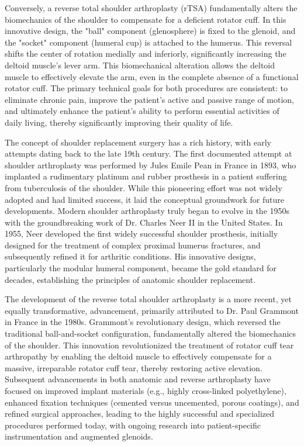 Conversely, a reverse total shoulder arthroplasty (rTSA) fundamentally alters the biomechanics of the shoulder to compensate for a deficient rotator cuff. In this innovative design, the "ball" component (glenosphere) is fixed to the glenoid, and the "socket" component (humeral cup) is attached to the humerus. This reversal shifts the center of rotation medially and inferiorly, significantly increasing the deltoid muscle's lever arm. This biomechanical alteration allows the deltoid muscle to effectively elevate the arm, even in the complete absence of a functional rotator cuff. The primary technical goals for both procedures are consistent: to eliminate chronic pain, improve the patient's active and passive range of motion, and ultimately enhance the patient's ability to perform essential activities of daily living, thereby significantly improving their quality of life.

The concept of shoulder replacement surgery has a rich history, with early attempts dating back to the late 19th century. The first documented attempt at shoulder arthroplasty was performed by Jules Emile Pean in France in 1893, who implanted a rudimentary platinum and rubber prosthesis in a patient suffering from tuberculosis of the shoulder. While this pioneering effort was not widely adopted and had limited success, it laid the conceptual groundwork for future developments. Modern shoulder arthroplasty truly began to evolve in the 1950s with the groundbreaking work of Dr. Charles Neer II in the United States. In 1955, Neer developed the first widely successful shoulder prosthesis, initially designed for the treatment of complex proximal humerus fractures, and subsequently refined it for arthritic conditions. His innovative designs, particularly the modular humeral component, became the gold standard for decades, establishing the principles of anatomic shoulder replacement.

The development of the reverse total shoulder arthroplasty is a more recent, yet equally transformative, advancement, primarily attributed to Dr. Paul Grammont in France in the 1980s. Grammont's revolutionary design, which reversed the traditional ball-and-socket configuration, fundamentally altered the biomechanics of the shoulder. This innovation revolutionized the treatment of rotator cuff tear arthropathy by enabling the deltoid muscle to effectively compensate for a massive, irreparable rotator cuff tear, thereby restoring active elevation. Subsequent advancements in both anatomic and reverse arthroplasty have focused on improved implant materials (e.g., highly cross-linked polyethylene), enhanced fixation techniques (cemented versus uncemented, porous coatings), and refined surgical approaches, leading to the highly successful and specialized procedures performed today, with ongoing research into patient-specific instrumentation and augmented glenoids.

